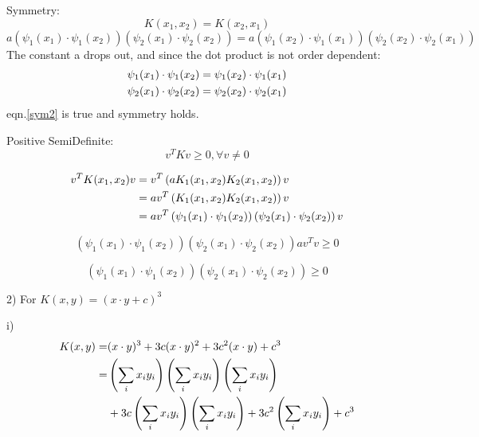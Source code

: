 \documentclass[12pt]{article}
\begin{document}
Symmetry: 
\begin{equation}
    K(x_1,x_2) = K(x_2,x_1)
\end{equation}
\begin{equation}
    a\left(\psi_1(x_1)\cdot\psi_1(x_2)\right)\left(\psi_2(x_1)\cdot\psi_2(x_2)\right) 
    = a\left(\psi_1(x_2)\cdot\psi_1(x_1)\right)\left(\psi_2(x_2)\cdot\psi_2(x_1)\right)
    \label{sym2}
\end{equation}
The constant a drops out, and since the dot product is not order dependent: 
\begin{align}
    \psi_1(x_1)\cdot\psi_1(x_2) = \psi_1(x_2)\cdot\psi_1(x_1) \notag \\
    \psi_2(x_1)\cdot\psi_2(x_2) = \psi_2(x_2)\cdot\psi_2(x_1)
\end{align}
eqn.\ref{sym2} is true and symmetry holds. 

Positive SemiDefinite: 
\begin{equation}
    v^T K v \geq 0, \forall v\neq 0
\end{equation}

\begin{align}
    v^T K(x_1,x_2) v &= v^T \left( aK_1(x_1,x_2)K_2(x_1,x_2) \right) v \notag \\
    &= av^T \left( K_1(x_1,x_2)K_2(x_1,x_2) \right) v \notag \\
    &= av^T \left(\psi_1(x_1) \cdot \psi_1(x_2)\right)\left(\psi_2(x_1) \cdot \psi_2(x_2)\right) v
\end{align}

\begin{equation}
    \left(\psi_1(x_1) \cdot \psi_1(x_2)\right)\left(\psi_2(x_1) \cdot \psi_2(x_2)\right)av^Tv \geq 0
\end{equation}

\begin{equation}
    \left(\psi_1(x_1) \cdot \psi_1(x_2)\right)\left(\psi_2(x_1) \cdot \psi_2(x_2)\right) \geq 0
\end{equation}

\pagebreak
\setcounter{equation}{0}
2) For $K(x,y) = (x\cdot y + c)^3$

i)  
\begin{align}
   K(x,y) =& (x \cdot y)^3  + 3c(x \cdot y)^2 + 3c^2(x \cdot y) + c^3 \notag \\
   =& \left(\sum_i x_iy_i\right)\left(\sum_i x_iy_i\right)\left(\sum_i x_iy_i\right) \notag \\
   &+ 3c\left(\sum_i x_iy_i\right)\left(\sum_i x_iy_i\right) + 3c^2\left(\sum_i x_iy_i\right) + c^3
\end{align}
\end{document}
